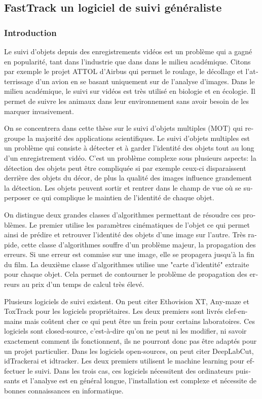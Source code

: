 \begin{otherlanguage}{french}
\subsubsection*{}
\subsection*{FastTrack un logiciel de suivi généraliste}
\subsubsection*{Introduction}
Le suivi d'objets depuis des enregistrements vidéos est un problème qui a gagné en popularité, tant dans l'industrie que dans dans le milieu académique. Citons par exemple le projet ATTOL d'Airbus qui permet le roulage, le décollage et l'atterrissage d'un avion en se basant uniquement sur de l'analyse d'images. Dans le milieu académique, le suivi sur vidéos est très utilisé en biologie et en écologie. Il permet de suivre les animaux dans leur environnement sans avoir besoin de les marquer invasivement.

On se concentrera dans cette thèse sur le suivi d'objets multiples (MOT) qui regroupe la majorité des applications scientifiques. Le suivi d'objets multiples est un problème qui consiste à détecter et à garder l'identité des objets tout au long d'un enregistrement vidéo. C'est un problème complexe sous plusieurs aspects: la détection des objets peut être compliquée si par exemple ceux-ci disparaissent derrière des objets du décor, de plus la qualité des images influence grandement la détection. Les objets peuvent sortir et rentrer dans le champ de vue où se superposer ce qui complique le maintien de l'identité de chaque objet.

On distingue deux grandes classes d'algorithmes permettant de résoudre ces problèmes. Le premier utilise les paramètres cinématiques de l'objet ce qui permet ainsi de prédire et retrouver l'identité des objets d'une image sur l'autre. Très rapide, cette classe d'algorithmes souffre d'un problème majeur, la propagation des erreurs. Si une erreur est commise sur une image, elle se propagera jusqu'à la fin du film. La deuxième classe d'algorithmes utilise une "carte d'identité" extraite pour chaque objet. Cela permet de contourner le problème de propagation des erreurs au prix d'un temps de calcul très élevé.

Plusieurs logiciels de suivi existent. On peut citer Ethovision XT, Any-maze et ToxTrack pour les logiciels propriétaires. Les deux premiers sont livrés clef-en-mains mais coûtent cher ce qui peut être un frein pour certains laboratoires. Ces logiciels sont closed-source, c’est-à-dire qu'on ne peut ni les modifier, ni savoir exactement comment ils fonctionnent, ils ne pourront donc pas être adaptés pour un projet particulier. Dans les logiciels open-sources, on peut citer DeepLabCut, idTrackerai et idtracker. Les deux premiers utilisent le machine learning pour effectuer le suivi. Dans les trois cas, ces logiciels nécessitent des ordinateurs puissants et l'analyse est en général longue, l'installation est complexe et nécessite de bonnes connaissances en informatique.


\end{otherlanguage}
